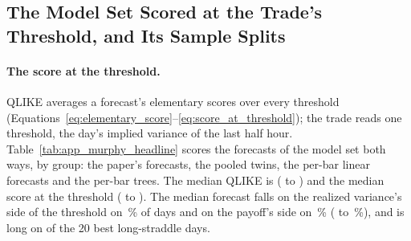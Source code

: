 %

\subsection{The Model Set Scored at the Trade's Threshold, and Its Sample Splits}
\label{sec:app_murphy_splits_headline}

\paragraph{The score at the threshold.} QLIKE averages a forecast's elementary scores over
every threshold (Equations~\eqref{eq:elementary_score}--\eqref{eq:score_at_threshold}); the
trade reads one threshold, the day's implied variance of the last half hour.
Table~\ref{tab:app_murphy_headline} scores the \hmurNSet{} forecasts of the model set both
ways, by group: the \hmurNPaper{} paper's forecasts, the \hmurNPooled{} pooled twins, the
\hmurNPerbarLinear{} per-bar linear forecasts and the \hmurNTrees{} per-bar trees. The median
QLIKE is \hmurQLIKEMed{} (\hmurQLIKEMin{} to \hmurQLIKEMax) and the median score at the
threshold \hmurESMed{} (\hmurESMin{} to \hmurESMax). The median forecast falls on the realized
variance's side of the threshold on \hmurHitVarMed\,\% of days and on the payoff's side on
\hmurHitPayMed\,\% (\hmurHitPayMin{} to \hmurHitPayMax\,\%), and is long on \hmurTopMed{} of
the 20 best long-straddle days.

